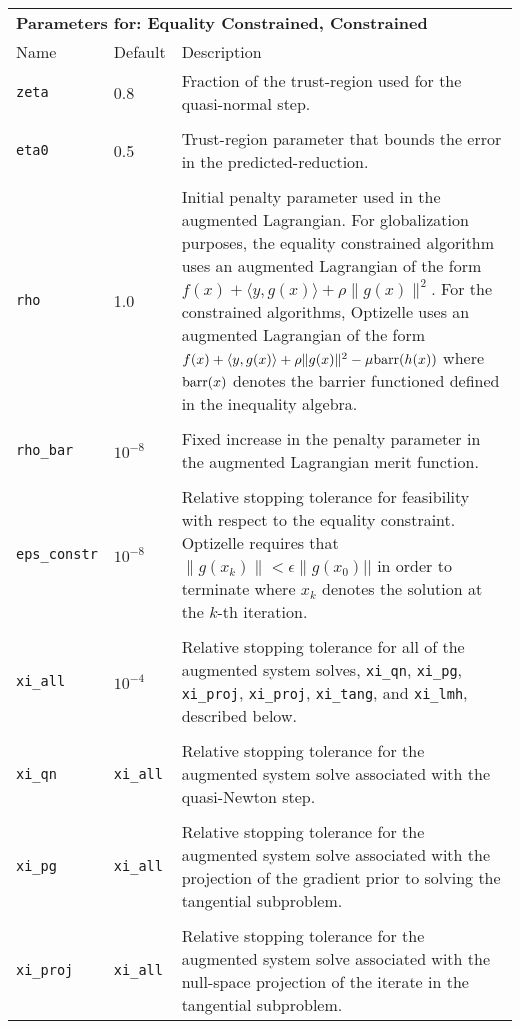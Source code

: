 \documentclass{report}
\begin{document}
\begin{longtable}{llp{}}
\\
\multicolumn{3}{p{\textwidth}}{\bf Parameters for: Equality Constrained, Constrained}\\
Name & Default & Description\\
\texttt{zeta} & 0.8 & Fraction of the trust-region used for the quasi-normal step.\\
\\
\texttt{eta0} & 0.5 & Trust-region parameter that bounds the error in the predicted-reduction.\\
\\
\texttt{rho} & 1.0 & Initial penalty parameter used in the augmented Lagrangian.  For globalization purposes, the equality constrained algorithm uses an augmented Lagrangian of the form $f(x)+\langle y,g(x)\rangle+\rho\|g(x)\|^2$.  For the constrained algorithms, Optizelle uses an augmented Lagrangian of the form $f(x)+\langle y,g(x)\rangle+\rho\|g(x)\|^2-\mu \textnormal{barr}(h(x))$ where $\textnormal{barr}(x)$ denotes the barrier functioned defined in the inequality algebra.\\
\\
\texttt{rho\_bar} & $10^{-8}$ & Fixed increase in the penalty parameter in the augmented Lagrangian merit function.\\
\\
\texttt{eps\_constr} & $10^{-8}$ & Relative stopping tolerance for feasibility with respect to the equality constraint.  Optizelle requires that $\|g(x_k)\|<\epsilon\|g(x_0)||$ in order to terminate where $x_k$ denotes the solution at the $k$-th iteration.\\
\\
\texttt{xi\_all} & $10^{-4}$ & Relative stopping tolerance for all of the augmented system solves, \texttt{xi\_qn}, \texttt{xi\_pg}, \texttt{xi\_proj}, \texttt{xi\_proj}, \texttt{xi\_tang}, and \texttt{xi\_lmh}, described below.\\
\\
\texttt{xi\_qn} & \texttt{xi\_all} & Relative stopping tolerance for the augmented system solve associated with the quasi-Newton step.\\
\\
\texttt{xi\_pg} & \texttt{xi\_all} & Relative stopping tolerance for the augmented system solve associated with the projection of the gradient prior to solving the tangential subproblem.\\
\\
\texttt{xi\_proj} & \texttt{xi\_all} & Relative stopping tolerance for the augmented system solve associated with the null-space projection of the iterate in the tangential subproblem.\\ 

\end{longtable}
\end{document}
